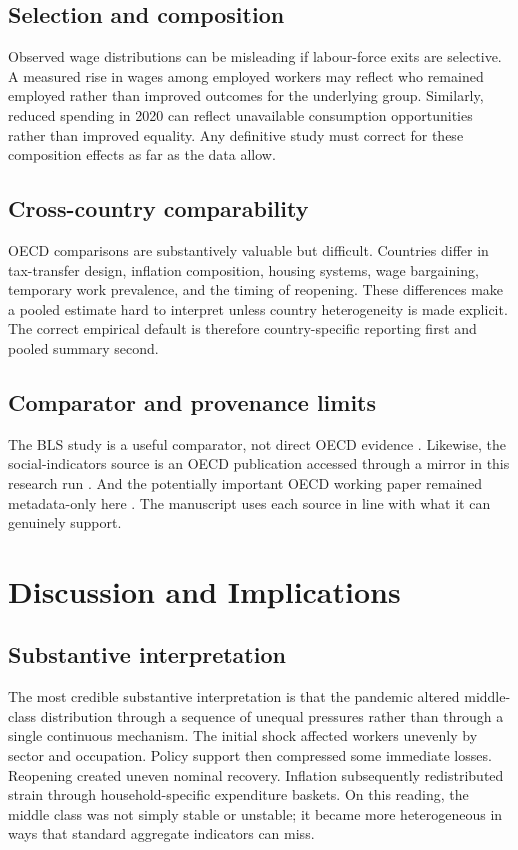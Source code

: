 \documentclass[11pt]{article}
\begin{document}
\subsection{Selection and composition}
Observed wage distributions can be misleading if labour-force exits are selective. A measured rise in wages among employed workers may reflect who remained employed rather than improved outcomes for the underlying group. Similarly, reduced spending in 2020 can reflect unavailable consumption opportunities rather than improved equality. Any definitive study must correct for these composition effects as far as the data allow.

\subsection{Cross-country comparability}
OECD comparisons are substantively valuable but difficult. Countries differ in tax-transfer design, inflation composition, housing systems, wage bargaining, temporary work prevalence, and the timing of reopening. These differences make a pooled estimate hard to interpret unless country heterogeneity is made explicit. The correct empirical default is therefore country-specific reporting first and pooled summary second.

\subsection{Comparator and provenance limits}
The BLS study is a useful comparator, not direct OECD evidence \citep{consumptioninequal2024bls}. Likewise, the social-indicators source is an OECD publication accessed through a mirror in this research run \citep{societyataglance202024bolletti}. And the potentially important OECD working paper remained metadata-only here \citep{oecdeconomicsdepar2023one}. The manuscript uses each source in line with what it can genuinely support.

\section{Discussion and Implications}

\subsection{Substantive interpretation}
The most credible substantive interpretation is that the pandemic altered middle-class distribution through a sequence of unequal pressures rather than through a single continuous mechanism. The initial shock affected workers unevenly by sector and occupation. Policy support then compressed some immediate losses. Reopening created uneven nominal recovery. Inflation subsequently redistributed strain through household-specific expenditure baskets. On this reading, the middle class was not simply stable or unstable; it became more heterogeneous in ways that standard aggregate indicators can miss.
\end{document}
